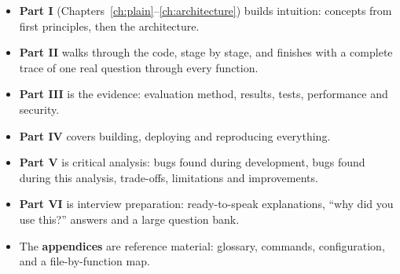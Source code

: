 \begin{itemize}
  \item \textbf{Part I} (Chapters~\ref{ch:plain}--\ref{ch:architecture}) builds intuition: concepts from first principles, then the architecture.
  \item \textbf{Part II} walks through the code, stage by stage, and finishes with a complete trace of one real question through every function.
  \item \textbf{Part III} is the evidence: evaluation method, results, tests, performance and security.
  \item \textbf{Part IV} covers building, deploying and reproducing everything.
  \item \textbf{Part V} is critical analysis: bugs found during development, bugs found during this analysis, trade-offs, limitations and improvements.
  \item \textbf{Part VI} is interview preparation: ready-to-speak explanations, ``why did you use this?'' answers and a large question bank.
  \item The \textbf{appendices} are reference material: glossary, commands, configuration, and a file-by-function map.
\end{itemize}
